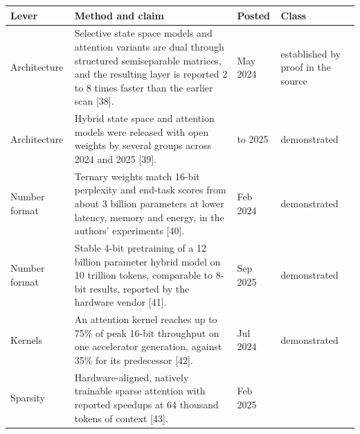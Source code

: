 \documentclass[10pt,letterpaper]{article}
\newcounter{none}
\begin{document}
{\def\LTcaptype{none} %
{\footnotesize\setlength{\tabcolsep}{3.8pt}\renewcommand{\arraystretch}{1.15}
\begin{longtable}[]{@{}
  >{\raggedright\arraybackslash}p{}
  >{\raggedright\arraybackslash}p{}
  >{\raggedright\arraybackslash}p{}
  >{\raggedright\arraybackslash}p{}@{}}
\toprule\noalign{}
\begin{minipage}[b]{\linewidth}\raggedright
\textbf{Lever}
\end{minipage} & \begin{minipage}[b]{\linewidth}\raggedright
\textbf{Method and claim}
\end{minipage} & \begin{minipage}[b]{\linewidth}\raggedright
\textbf{Posted}
\end{minipage} & \begin{minipage}[b]{\linewidth}\raggedright
\textbf{Class}
\end{minipage} \\
\midrule\noalign{}
\endhead
\bottomrule\noalign{}
\endlastfoot
Architecture & Selective state space models and attention variants are
dual through structured semiseparable matrices, and the resulting layer
is reported 2 to 8 times faster than the earlier scan {[}38{]}. & 31 May
2024 & established by proof in the source \\
Architecture & Hybrid state space and attention models were released
with open weights by several groups across 2024 and 2025 {[}39{]}. &
2024 to 2025 & demonstrated \\
Number format & Ternary weights match 16-bit perplexity and end-task
scores from about 3 billion parameters at lower latency, memory and
energy, in the authors' experiments {[}40{]}. & 27 Feb 2024 &
demonstrated \\
Number format & Stable 4-bit pretraining of a 12 billion parameter
hybrid model on 10 trillion tokens, comparable to 8-bit results,
reported by the hardware vendor {[}41{]}. & Sep 2025 & demonstrated \\
Kernels & An attention kernel reaches up to 75\% of peak 16-bit
throughput on one accelerator generation, against 35\% for its
predecessor {[}42{]}. & Jul 2024 & demonstrated \\
Sparsity & Hardware-aligned, natively trainable sparse attention with
reported speedups at 64 thousand tokens of context {[}43{]}. & Feb 2025

\end{longtable}}}
\end{document}
